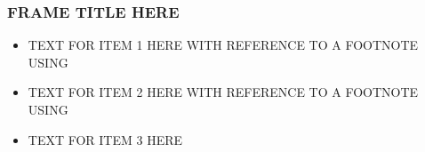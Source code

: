 \documentclass{beamer}
\begin{document}
  \begin{frame}
    \frametitle{FRAME TITLE HERE}
    \begin{itemize}
            \item {} TEXT FOR ITEM 1 HERE WITH REFERENCE TO A FOOTNOTE USING \footnotemark
            \item {} TEXT FOR ITEM 2 HERE WITH REFERENCE TO A FOOTNOTE USING \footnotemark
        \item {} TEXT FOR ITEM 3 HERE
    \end{itemize}
  \end{frame}
\end{document}
